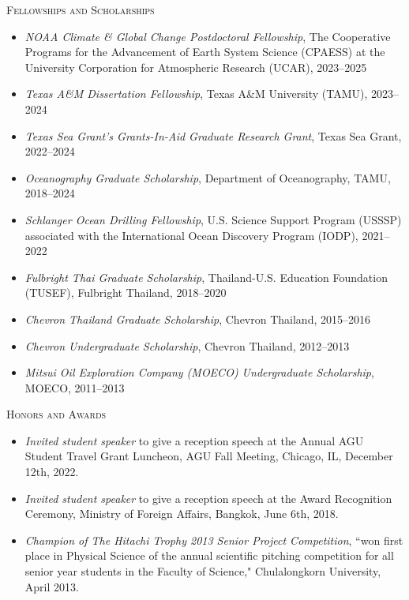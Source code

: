\documentclass[10pt, letter]{article}
\newcommand{\margintext}[1]{\marginnote{\normalsize\textbf #1 |}}
\begin{document}
\pagestyle{fancy}

\fancyfoot{} %

\bigskip
\margintext{Awards}
\textsc{Fellowships and Scholarships}
\begin{itemize}[leftmargin=*]
    \item[] \emph{NOAA Climate \& Global Change Postdoctoral Fellowship}, The Cooperative Programs for the Advancement of Earth System Science (CPAESS) at the University Corporation for Atmospheric Research (UCAR), 2023–2025
    \item[] \emph{Texas A\&M Dissertation Fellowship}, Texas A\&M University (TAMU), 2023–2024
    \item[] \emph{Texas Sea Grant's Grants-In-Aid Graduate Research Grant}, Texas Sea Grant, 2022–2024
    \item[] \emph{Oceanography Graduate Scholarship}, Department of Oceanography, TAMU, 2018–2024
    \item[] \emph{Schlanger Ocean Drilling Fellowship}, U.S. Science Support Program (USSSP) associated with the International Ocean Discovery Program (IODP), 2021–2022
    \item[] \emph{Fulbright Thai Graduate Scholarship}, Thailand-U.S. Education Foundation (TUSEF), Fulbright Thailand, 2018–2020
    \item[] \emph{Chevron Thailand Graduate Scholarship}, Chevron Thailand, 2015–2016
    \item[] \emph{Chevron Undergraduate Scholarship}, Chevron Thailand, 2012–2013
    \item[] \emph{Mitsui Oil Exploration Company (MOECO) Undergraduate Scholarship}, MOECO, 2011–2013 

\end{itemize}

\textsc{Honors and Awards}
\begin{itemize}[leftmargin=*]
    \item[] \emph{Invited student speaker} to give a reception speech at the Annual AGU Student Travel Grant Luncheon, AGU Fall Meeting, Chicago, IL, December 12th, 2022.
    \item[] \emph{Invited student speaker} to give a reception speech at the Award Recognition Ceremony, Ministry of Foreign Affairs, Bangkok, June 6th, 2018.
    \item[] \emph{Champion of The Hitachi Trophy 2013 Senior Project Competition}, ``won first place in Physical Science of the annual scientific pitching competition for all senior year students in the Faculty of Science," Chulalongkorn University, April 2013.
\end{itemize}
\end{document}
